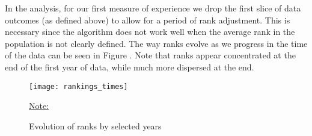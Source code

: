 

In the analysis, for our first measure of experience we drop the first slice of data outcomes (as defined above) to allow for a period of rank adjustment. This is necessary since the algorithm does not work well when the average rank in the population is not clearly defined. The way ranks evolve as we progress in the time of the data can be seen in Figure \label{fig:rankings_times}. Note that ranks appear concentrated at the end of the first year of data, while much more dispersed at the end.

\begin{figure}
  \texttt{[image: rankings\_times]}
  \caption{Evolution of ranks by selected years}
  \label{fig:rankings_times}
  \vskip 0.5mm
  { \footnotesize \underline{Note:} \par}
\end{figure}

